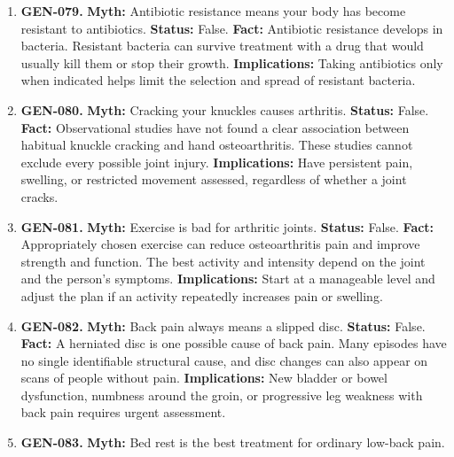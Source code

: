\documentclass[11pt,oneside]{book}
\begin{document}
\begin{enumerate}[leftmargin=0pt,labelwidth=0pt,labelsep=0pt,itemindent=0pt]
\item[] \textbf{GEN-079.} \textbf{Myth:} Antibiotic resistance means your body has become resistant to antibiotics.\newline
\textbf{Status:} False.\newline
\textbf{Fact:} Antibiotic resistance develops in bacteria. Resistant bacteria can survive treatment with a drug that would usually kill them or stop their growth. \cite{ref3}\newline
\textbf{Implications:} Taking antibiotics only when indicated helps limit the selection and spread of resistant bacteria.
\item[] \textbf{GEN-080.} \textbf{Myth:} Cracking your knuckles causes arthritis.\newline
\textbf{Status:} False.\newline
\textbf{Fact:} Observational studies have not found a clear association between habitual knuckle cracking and hand osteoarthritis. These studies cannot exclude every possible joint injury. \cite{ref304}\newline
\textbf{Implications:} Have persistent pain, swelling, or restricted movement assessed, regardless of whether a joint cracks.
\item[] \textbf{GEN-081.} \textbf{Myth:} Exercise is bad for arthritic joints.\newline
\textbf{Status:} False.\newline
\textbf{Fact:} Appropriately chosen exercise can reduce osteoarthritis pain and improve strength and function. The best activity and intensity depend on the joint and the person's symptoms. \cite{ref317}\newline
\textbf{Implications:} Start at a manageable level and adjust the plan if an activity repeatedly increases pain or swelling.
\item[] \textbf{GEN-082.} \textbf{Myth:} Back pain always means a slipped disc.\newline
\textbf{Status:} False.\newline
\textbf{Fact:} A herniated disc is one possible cause of back pain. Many episodes have no single identifiable structural cause, and disc changes can also appear on scans of people without pain. \cite{ref250}\newline
\textbf{Implications:} New bladder or bowel dysfunction, numbness around the groin, or progressive leg weakness with back pain requires urgent assessment.
\item[] \textbf{GEN-083.} \textbf{Myth:} Bed rest is the best treatment for ordinary low-back pain.\newline

\end{enumerate}
\end{document}
